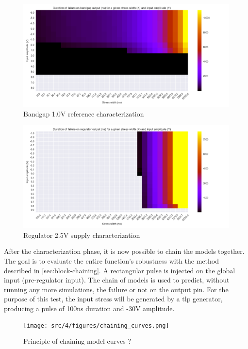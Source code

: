 \begin{figure}[!h]
  \centering
  \includegraphics[width=\textwidth]{src/4/figures/bandgap_cz.png}
  \caption{Bandgap 1.0V reference characterization}
  \label{bandgap_wb}
\end{figure}

\begin{figure}[!h]
  \centering
  \includegraphics[width=\textwidth]{src/4/figures/regulator_cz.png}
  \caption{Regulator 2.5V supply characterization}
  \label{regu_wb}
\end{figure}

After the characterization phase, it is now possible to chain the models together.
The goal is to evaluate the entire function's robustness with the method described in \ref{sec:block-chaining}.
A rectangular pulse is injected on the global input (pre-regulator input).
The chain of models is used to predict, without running any more simulations, the failure or not on the output pin.
For the purpose of this test, the input stress will be generated by a \gls{tlp} generator, producing a pulse of 100ns duration and -30V amplitude.

\begin{figure}[!h]
  \centering
  \texttt{[image: src/4/figures/chaining\_curves.png]}
  \caption{Principle of chaining model curves ?}
  \label{fig:chain-curves}
\end{figure}

